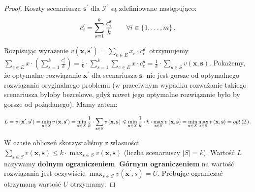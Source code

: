 \begin{proof}
	Koszty scenariusza $\textbf{s}^{\prime}$ dla $\mathcal{I}^{\prime}$ są zdefiniowane następująco:
	\begin{equation}
		c^{\prime}_{i} = \sum_{\mathclap{s = 1}}^{k} \frac{c_{i}^{\textbf{s}}}{k} \qquad \forall i \in \left\{ 1, \dots, m \right\}\text{.}
	\end{equation}
	
	Rozpisując wyrażenie $v \left( \textbf{x}, \textbf{s}^{\prime} \right) = \sum_{e \in E} x_{e} \cdot c^{\textbf{s}^{\prime}}_{e}$ otrzymujemy $\sum_{e \in E} x \cdot \left( \sum_{s = 1}^{k} \frac{c_{i}^{s}}{k} \right) = \frac{1}{k} \cdot \sum_{s = 1}^{k} \sum_{e \in E} x \cdot c^{\textbf{s}}_{e} = \frac{1}{k} \cdot \sum_{\textbf{s} \in S} v \left( \textbf{x}, \textbf{s} \right)$. Pokażemy, że optymalne rozwiązanie $\textbf{x}^{\prime}$ dla scenariusza $\textbf{s}_{\prime}$ nie jest gorsze od optymalnego rozwiązania oryginalnego problemu (w przeciwnym wypadku rozważanie takiego scenariusza byłoby bezcelowe, gdyż nawet jego optymalne rozwiązanie było by gorsze od pożądanego). Mamy zatem:
	
	\begin{equation}
		L = v \left( \textbf{x}^{\prime}, \textbf{s}^{\prime} \right) = \min_{\mathclap{\textbf{x} \in X}} v \left( \textbf{x}, \textbf{s}^{\prime} \right) = \min_{ \mathclap{\textbf{x} \in X}} \frac{1}{k} \cdot \sum_{\textbf{s} \in S} v \left( \textbf{x}, \textbf{s} \right) \leqslant \min_{ \mathclap{\textbf{x} \in X}} \frac{1}{k} \cdot k \cdot \max_{\textbf{s} \in S} v \left( \textbf{x}, \textbf{s} \right) = \min_{ \mathclap{\textbf{x} \in X}} \max_{\textbf{s} \in S} v \left( \textbf{x}, \textbf{s} \right) = opt \left( \mathcal{I}\right)\text{.}
	\end{equation}
	
	W czasie obliczeń skorzystaliśmy z własności $\sum_{\textbf{s} \in S} v \left( \textbf{x}, \textbf{s} \right) \leqslant k \cdot \max_{\textbf{s} \in S} v \left( \textbf{x}, \textbf{s} \right)$ (liczba scenariuszy $\left| S \right| = k$). Wartość $L$ nazywamy \textbf{dolnym ograniczeniem}. \textbf{Górnym ograniczeniem} na wartość rozwiązania jest oczywiście $\max_{s \in S} v \left( \textbf{x}^{\prime}, s \right) = U$. Próbując ograniczać otrzymaną wartość $U$ otrzymamy:
	

\end{proof}
